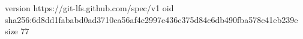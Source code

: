 version https://git-lfs.github.com/spec/v1
oid sha256:6d8dd1fababd0ad3710ca56af4c2997e436c375d84c6db490fba578c41eb239e
size 77
